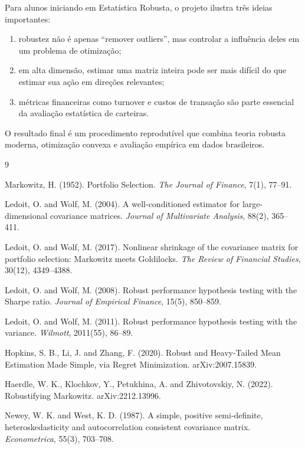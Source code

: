 \documentclass[12pt,a4paper]{article}
\begin{document}
Para alunos iniciando em Estatística Robusta, o projeto ilustra três ideias importantes:

\begin{enumerate}[leftmargin=*]
  \item robustez não é apenas ``remover outliers'', mas controlar a influência deles em um problema
  de otimização;
  \item em alta dimensão, estimar uma matriz inteira pode ser mais difícil do que estimar sua ação
  em direções relevantes;
  \item métricas financeiras como turnover e custos de transação são parte essencial da avaliação
  estatística de carteiras.
\end{enumerate}

O resultado final é um procedimento reprodutível que combina teoria robusta moderna, otimização
convexa e avaliação empírica em dados brasileiros.

\begin{thebibliography}{9}

Markowitz, H. (1952).
\newblock Portfolio Selection.
\newblock \emph{The Journal of Finance}, 7(1), 77--91.

Ledoit, O. and Wolf, M. (2004).
\newblock A well-conditioned estimator for large-dimensional covariance matrices.
\newblock \emph{Journal of Multivariate Analysis}, 88(2), 365--411.

Ledoit, O. and Wolf, M. (2017).
\newblock Nonlinear shrinkage of the covariance matrix for portfolio selection: Markowitz meets Goldilocks.
\newblock \emph{The Review of Financial Studies}, 30(12), 4349--4388.

Ledoit, O. and Wolf, M. (2008).
\newblock Robust performance hypothesis testing with the Sharpe ratio.
\newblock \emph{Journal of Empirical Finance}, 15(5), 850--859.

Ledoit, O. and Wolf, M. (2011).
\newblock Robust performance hypothesis testing with the variance.
\newblock \emph{Wilmott}, 2011(55), 86--89.

Hopkins, S. B., Li, J. and Zhang, F. (2020).
\newblock Robust and Heavy-Tailed Mean Estimation Made Simple, via Regret Minimization.
\newblock arXiv:2007.15839.

Haerdle, W. K., Klochkov, Y., Petukhina, A. and Zhivotovskiy, N. (2022).
\newblock Robustifying Markowitz.
\newblock arXiv:2212.13996.

Newey, W. K. and West, K. D. (1987).
\newblock A simple, positive semi-definite, heteroskedasticity and autocorrelation consistent covariance matrix.
\newblock \emph{Econometrica}, 55(3), 703--708.

\end{thebibliography}
\end{document}
